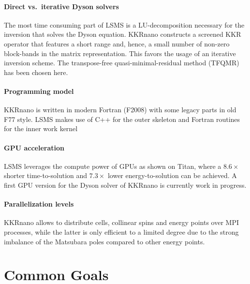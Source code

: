 \documentclass{llncs}
\def\KKRnano{{KKRnano}}
\def\LSMS{{LSMS}}
\begin{document}
\paragraph{Direct vs.~iterative Dyson solvers}
The most time consuming part of \LSMS{} is a LU-decomposition necessary 
for the inversion that solves the Dyson equation.
%
%
\KKRnano{} constructs a screened KKR operator that features a short range and, hence, a small number
of non-zero block-bands in the matrix representation. This favors the usage of an iterative
inversion scheme. The transpose-free quasi-minimal-residual method (TFQMR) has been chosen here.

\paragraph{Programming model}
\KKRnano{} is written in modern Fortran (F2008) with some legacy parts in old F77 style.
\LSMS{} makes use of C++ for the outer skeleton and Fortran routines for the inner work kernel
%

\paragraph{GPU acceleration}
\LSMS{} leverages the compute power of GPUs as shown on Titan, where a $8.6\times$ shorter
time-to-solution and $7.3\times$ lower energy-to-solution can be achieved.
A first GPU version for the Dyson solver of \KKRnano{} is currently work in progress.

\paragraph{Parallelization levels}
\KKRnano{} allows to distribute cells, collinear spins and energy points over MPI processes,
while the latter is only efficient to a limited degree due to the strong imbalance of the 
Matsubara poles compared to other energy points.

\section{Common Goals} \label{section:common}
\end{document}
